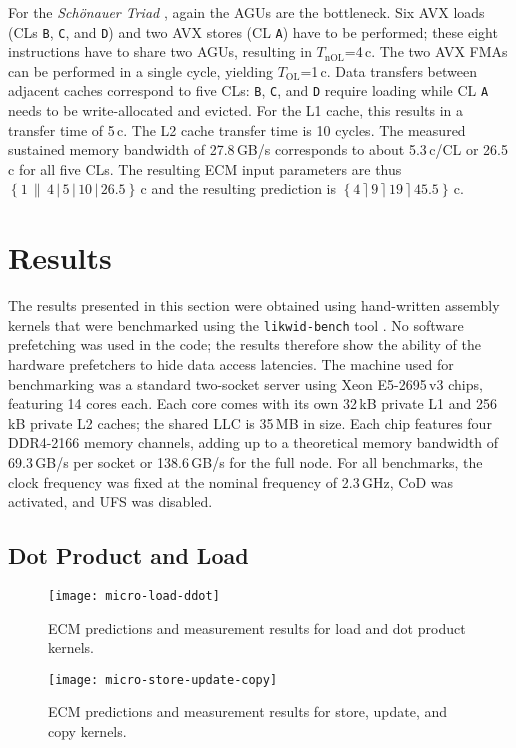 \documentclass{llncs}
\newcommand{\epsep}{\rceil}
\newcommand{\olsep}{\|}
\newcommand{\nolsep}{|}
\newcommand{\ecmspace}{\,}
\newcommand{\ecm}[6]{\mbox{$\left\{{#1}\ecmspace\olsep\ecmspace {#2}\ecmspace\nolsep\ecmspace {#3}\ecmspace\nolsep\ecmspace {#4}\ecmspace\nolsep\ecmspace {#5}\right\}\ecmspace{#6}$}}
\newcommand{\ecmp}[5]{\mbox{$\left\{{#1}\ecmspace\epsep\ecmspace {#2}\ecmspace\epsep\ecmspace {#3}\ecmspace\epsep\ecmspace {#4}\right\}\ecmspace{#5}$}}
\begin{document}
For the \textit{Sch\"onauer Triad} \cite{schoenauer:00}, again the AGUs are the
bottleneck. Six AVX loads (CLs \texttt{B}, \texttt{C}, and \texttt{D}) and two
AVX stores (CL \texttt{A}) have to be performed; these eight instructions have
to share two AGUs, resulting in $T_\mathrm{nOL}$=4\,c. The two AVX FMAs can be
performed in a single cycle, yielding $T_\mathrm{OL}$=1\,c.  Data transfers
between adjacent caches correspond to five CLs: \texttt{B}, \texttt{C}, and
\texttt{D} require loading while CL \texttt{A} needs to be write-allocated and
evicted. For the L1 cache, this results in a transfer time of 5\,c. The L2
cache transfer time is 10 cycles. The measured sustained memory bandwidth of
27.8\,GB/s corresponds to about 5.3\,c/CL or 26.5\,c for all five CLs.  The
resulting ECM input parameters are thus \ecm{1}{4}{5}{10}{26.5}{\mathrm{c}} and
the resulting prediction is \ecmp{4}{9}{19}{45.5}{\mathrm{c}}.


\section{Results}
\label{sec:results}

The results presented in this section were obtained using hand-written assembly
kernels that were benchmarked using the \texttt{likwid-bench} tool
\cite{Treibig:2011:3}.  No software prefetching was used in the code; the
results therefore show the ability of the hardware prefetchers to hide data
access latencies. The machine used for benchmarking was a standard two-socket
server using Xeon E5-2695\,v3 chips, featuring 14 cores each. Each core comes
with its own 32\,kB private L1 and 256\,kB private L2 caches; the shared
\ac{LLC} is 35\,MB in size. Each chip features four DDR4-2166 memory channels,
adding up to a theoretical memory bandwidth of 69.3\,GB/s per socket or
138.6\,GB/s for the full node.  For all benchmarks, the clock frequency was
fixed at the nominal frequency of 2.3\,GHz, \ac{CoD} was activated, and
\ac{UFS} was disabled.


\subsection{Dot Product and Load}


\begin{figure}[tb]
\begin{minipage}{.49\textwidth}
    \centering
    \texttt{[image: micro-load-ddot]}
    \caption{ECM predictions and measurement results for load and dot product kernels.}
    \label{fig:micro-loadddot}
\end{minipage}\hfill
\begin{minipage}{.49\textwidth}
    \centering
    \texttt{[image: micro-store-update-copy]}
    \caption{ECM predictions and measurement results for store, update, and copy kernels.}
    \label{fig:micro-stupco}
\end{minipage}
\end{figure}
\end{document}
